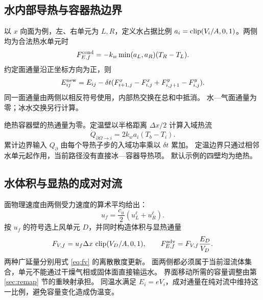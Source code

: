 \subsection{水内部导热与容器热边界}
以 $x$ 向面为例，左、右单元为 $L,R$，定义水占据比例
$a_i=\operatorname{clip}(V_i/A,0,1)$。两侧均为合法热水单元时
\begin{equation}
 F_{E,f}^{\rm cond}=-k_w\min(a_L,a_R)(T_R-T_L).
\end{equation}
约定面通量沿正坐标方向为正，则
\begin{equation}
 E_{ij}^{\rm new}=E_{ij}-\delta t
 (F^x_{i+1,j}-F^x_{i,j}+F^y_{i,j+1}-F^y_{i,j}).
 \label{eq:fv}
\end{equation}
同一面通量由两侧以相反符号使用，内部热交换在总和中抵消。
水—气面通量为零；冰水交换另行计算。

绝热容器壁的热通量为零。定温壁以半格距离 $\Delta x/2$ 计算入域热流
\begin{equation}
 \dot Q_{\partial\Omega\to i}=2k_wa_i(T_b-T_i).
\end{equation}
累计边界输入 $Q_\partial$ 由每个导热子步的入域功率乘以 $\delta t$ 累加。
定温边界只通过相邻水单元起作用，当前路径没有直接冰—容器导热项。
默认示例的四壁均为绝热。

\subsection{水体积与显热的成对对流}
面物理速度由两侧受力速度的算术平均给出：
\begin{equation}
 u_f=\frac{c_u}{2}(u_L^\ell+u_R^\ell).
\end{equation}
按 $u_f$ 的符号选上风单元 $D$，并同时构造体积与显热通量
\begin{equation}
 F_{V,f}=u_f\Delta x\,\operatorname{clip}(V_D/A,0,1),\qquad
 F_{E,f}^{\rm adv}=F_{V,f}\frac{E_D}{V_D}.
 \label{eq:paired-flux}
\end{equation}
两种广延量分别用式 \eqref{eq:fv} 的离散散度更新。
面两侧都必须属于当前湿流体集合，单元不能通过干燥气相或固体面直接输运水。
界面移动所需的容量调整由第 \ref{sec:remap} 节的重映射承担。
同温水满足 $E_i=eV_i$，成对通量在纯对流中维持这一比例，避免容量变化造成伪温变。


